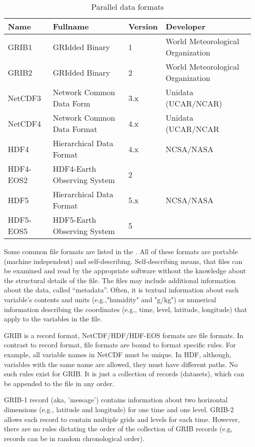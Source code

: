 \begin{table}
  \centering
  \begin{tabular}{l|l|l|l}
    Name      & Fullname                   & Version & Developer \\
    \hline
    GRIB1     & GRIdded Binary             & 1       & World Meteorological Organization\\
    GRIB2     & GRIdded Binary             & 2       & World Meteorological Organization\\
    NetCDF3   & Network Common Data Form   & 3.x     & Unidata (UCAR/NCAR)\\
    NetCDF4   & Network Common Data Format & 4.x     & Unidata (UCAR/NCAR\\
    HDF4      & Hierarchical Data Format   & 4.x     & NCSA/NASA\\
    HDF4-EOS2 & HDF4-Earth Observing System & 2       & \\
    HDF5      & Hierarchical Data Format   & 5.x     & NCSA/NASA\\
    HDF5-EOS5 & HDF5-Earth Observing System & 5       & \\
\end{tabular}
\caption{Parallel data formats}
\label{tab:fformats}
\end{table}


Some common file formats are listed in the .
All of these formats are portable (machine independent) and self-describing.
Self-describing means, that files can be examined and read by the appropriate software without the knowledge about the structural details of the file.
The files may include additional information about the data, called ``metadata''.
Often, it is textual information about each variable's contents and units (e.g.,"humidity" and "g/kg") or numerical information describing the coordinates (e.g., time, level, latitude, longitude) that apply to the variables in the file.

GRIB is a record format, NetCDF/HDF/HDF-EOS formats are file formats.
In contrast to record format, file formats are bound to format specific rules.
For example, all variable names in NetCDF must be unique.
In HDF, although, variables with the same name are allowed, they must have different paths.
No such rules exist for GRIB.
It is just a collection of records (datasets), which can be appended to the file in any order.

GRIB-1 record (aka, 'message') contains information about two horizontal dimensions (e.g., latitude and longitude) for one time and one level.
GRIB-2 allows each record to contain multiple grids and levels for each time.
However, there are no rules dictating the order of the collection of GRIB records (e.g, records can be in random chronological order).


